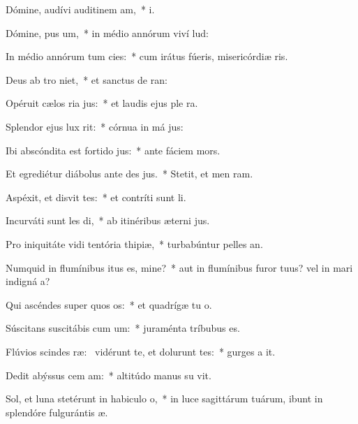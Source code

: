 \item Dómine, audívi auditinem am,~*  i.
\item Dómine, pus um,~* in médio annórum viví lud:
\item In médio annórum tum cies:~* cum irátus fúeris, misericórdiæ ris.
\item Deus ab tro niet,~* et sanctus de  ran:
\item Opéruit cælos ria jus:~* et laudis ejus ple  ra.
\item Splendor ejus  lux rit:~* córnua in má jus:
\item Ibi abscóndita est fortido jus:~* ante fáciem   mors.
\item Et egrediétur diábolus ante des jus.~* Stetit, et men  ram.
\item Aspéxit, et disvit tes:~* et contríti sunt  li.
\item Incurváti sunt les di,~* ab itinéribus æterni jus.
\item Pro iniquitáte vidi tentória thipiæ,~* turbabúntur pelles  an.
\item Numquid in flumínibus itus es, mine?~* aut in flumínibus furor tuus? vel in mari indigná a?
\item Qui ascéndes super quos os:~* et quadrígæ tu o.
\item Súscitans suscitábis cum um:~* juraménta tríbubus   es.
\item Flúvios scindes ræ:~\pscross{} vidérunt te, et dolurunt tes:~* gurges a it.
\item Dedit abýssus cem am:~* altitúdo manus su vit.
\item Sol, et luna stetérunt in habiculo o,~* in luce sagittárum tuárum, ibunt in splendóre fulgurántis  æ.
